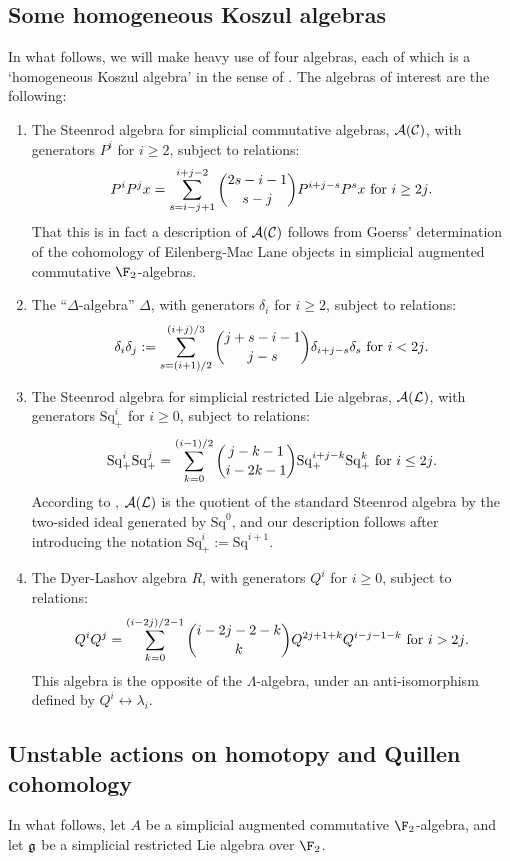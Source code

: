 \documentclass[10pt]{article}
\renewcommand{\Q}{Q}
\newcommand{\SqShift}{\Sq_{+}}
\newcommand{\Sq}{\mathrm{Sq}}
\newcommand{\Comm}{\calC}
\newcommand{\LieSteen}{\calA(\calL)}
\newcommand{\CommSteen}{\calA(\Comm)}
\newcommand{\deltaAlgebra}{\Delta}
\newcommand{\DyerLashov}{R}
\begin{document}
\begin{SteenrodAlgebrasAndTheirKoszulDuals}
\section{Some homogeneous Koszul algebras}
In what follows, we will make heavy use of four algebras, each of which is a `homogeneous Koszul algebra' in the sense of \cite{PriddyKoszul.pdf}. The algebras of interest are the following:
\begin{enumerate}\squishlist
\setlength{\parindent}{.25in}
\item The Steenrod algebra for simplicial commutative algebras, $\CommSteen$, with generators $P^i$ for $i\geq2$, subject to relations:
\[P^iP^jx=\sum_{s=i-j+1}^{i+j-2}{2s-i-1\choose s-j}P^{i+j-s}P^sx\textup{ for $i\geq2j$}.\]
That this is in fact a description of $\CommSteen$ follows from Goerss' determination \cite[p.14]{MR1089001} of the cohomology of Eilenberg-Mac Lane objects in simplicial augmented commutative $\F_2$-algebras.

\item The ``$\Delta$-algebra'' $\deltaAlgebra$, with generators $\delta_i$ for $i\geq2$, subject to relations:
\[\delta_i\delta_j:=\sum_{s=(i+1)/2}^{(i+j)/3}{j+s-i-1\choose j-s}\delta_{i+j-s}\delta_s\textup{ for $i<2j$.}\]
\item The Steenrod algebra for simplicial restricted Lie algebras, $\LieSteen$, with generators $\SqShift^i$ for $i\geq0$, subject to relations:
\[\SqShift^i\SqShift^j=\sum_{k=0}^{(i-1)/2}{j-k-1\choose i-2k-1}\SqShift^{i+j-k}\SqShift^k\textup{\ for $i\leq2j$.}\]
According to \cite[\S7]{PriddySimplicialLie.pdf}, $\LieSteen$ is the quotient of the standard Steenrod algebra by the two-sided ideal generated by $\Sq^0$, and our description follows after introducing the notation $\SqShift^i:=\Sq^{i+1}$.
%

\item The Dyer-Lashov algebra $\DyerLashov$, with generators $\Q^i$ for $i\geq0$, subject to relations:
\[\Q^i\Q^j=\sum_{k=0}^{(i-2j)/2-1}{i-2j-2-k\choose k}\Q^{2j+1+k}\Q^{i-j-1-k}\textup{\ for $i>2j$.}\]
This algebra is the opposite of the $\Lambda$-algebra, under an anti-isomorphism defined by $Q^i\longleftrightarrow \lambda_i$.
\end{enumerate}
\subsection{Unstable actions on homotopy and Quillen cohomology}
In what follows, let $A$ be a simplicial augmented commutative $\F_2$-algebra, and let $\mathfrak{g}$ be a simplicial restricted Lie algebra over $\F_2$.


\end{SteenrodAlgebrasAndTheirKoszulDuals}
\end{document}
